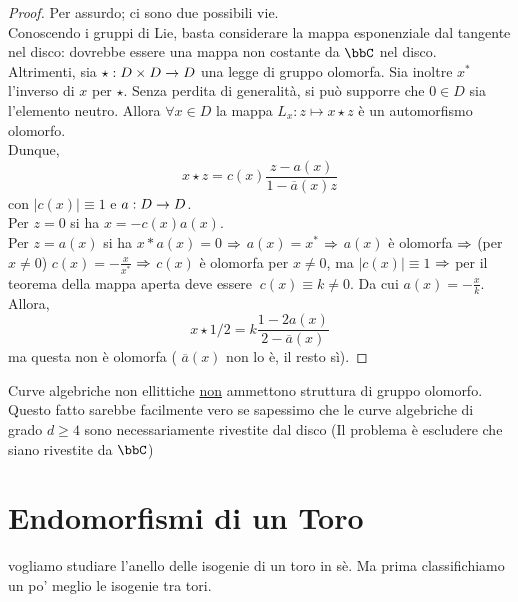 \begin{proof}
Per assurdo; ci sono due possibili vie.\\
Conoscendo i gruppi di Lie, basta considerare la mappa esponenziale dal tangente nel disco: dovrebbe essere una mappa non costante da $\bbC$ nel disco. \hfill \Lightning \\
Altrimenti, sia $\star : D\times D \rightarrow D$ una legge di gruppo olomorfa. Sia inoltre $x^{*}$ l'inverso di $x$ per $\star$. Senza perdita di generalità, si può supporre che $0 \in D$ sia l'elemento neutro.
Allora $\forall x\in D$ la mappa $L_{x}: z\mapsto x\star z$ è un automorfismo olomorfo. \\
Dunque,  $$x\star z = c(x)\frac{z -a(x)}{1- \overline{a}(x) z}$$
con $|c(x)|\equiv 1$ e $a:D \rightarrow D$.\\
Per $z=0$ si ha $x=-c(x)a(x)$.\\
Per $z=a(x)$ si ha $x*a(x)=0$ $\Rightarrow$ $a(x)=x^{*}$ $\Rightarrow$ $a(x)$ è olomorfa $\Rightarrow$ (per $x\neq 0$) $c(x)=-\frac{x}{x^{*}}$ $\Rightarrow$ $c(x)$ è olomorfa per $x\neq 0$, ma $|c(x)| \equiv 1$ $\Rightarrow$ per il teorema della mappa aperta deve essere $ \ c(x) \equiv k \neq 0$. Da cui $a(x)= -\frac{x}{k}$.\\
Allora, $$x\star 1/2 = k\frac{1-2a(x)}{2-\overline{a}(x)}$$
ma questa non è olomorfa ( $\overline{a}(x)$ non lo è, il resto sì). 

\end{proof}

\begin{corollario}
  Curve algebriche non ellittiche \underline{non} ammettono struttura di gruppo olomorfo.
  Questo fatto sarebbe facilmente vero se sapessimo che le curve algebriche di grado $d \ge 4$ sono necessariamente rivestite dal disco (Il problema è escludere che siano rivestite da $\bbC$)
\end{corollario}

\section{Endomorfismi di un Toro}
 vogliamo studiare l'anello delle isogenie di un toro in sè. Ma prima classifichiamo un po' meglio le isogenie tra tori.

